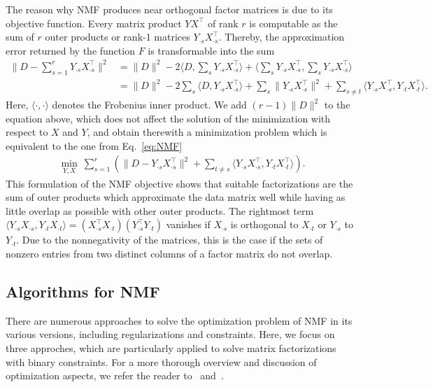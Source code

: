 The reason why NMF produces near orthogonal factor matrices is due to its objective function. Every matrix product $YX^\top$ of rank $r$ is computable as the sum of $r$ outer products or rank-1 matrices $Y_{\cdot s}X_{\cdot s}^\top$. Thereby, the approximation error returned by the function $F$ is transformable into the sum
\begin{align*}
\|D-\sum_{s=1}^rY_{\cdot s}X_{\cdot s}^\top\|^2 &= \|D\|^2 -2\langle D,\sum_sY_{\cdot s}X_{\cdot s}^\top\rangle +\langle \sum_sY_{\cdot s}X_{\cdot s}^\top,\sum_sY_{\cdot s}X_{\cdot s}^\top\rangle\\
&= \|D\|^2 -2\sum_s\langle D,Y_{\cdot s}X_{\cdot s}^\top\rangle +\sum_s \|Y_{\cdot s}X_{\cdot s}^\top\|^2 + \sum_{s\neq t}\langle Y_{\cdot s}X_{\cdot s}^\top,Y_{\cdot t}X_{\cdot t}^\top\rangle.
\end{align*}
Here, $\langle\cdot,\cdot\rangle$ denotes the Frobenius inner product. We add $(r-1)\|D\|^2$ to the equation above, which does not affect the solution of the minimization with respect to $X$ and $Y$, and obtain therewith a minimization problem which is equivalent to the one from Eq.~\eqref{eq:NMF} 
\begin{align}
\min_{Y,X}\ \sum_{s=1}^r \left( \|D-Y_{\cdot s}X_{\cdot s}^\top\|^2 + \sum_{t\neq s}\langle Y_{\cdot s}X_{\cdot s}^\top,Y_{\cdot t}X_{\cdot t}^\top\rangle\right).\label{eq:NMFOrth}
\end{align}
This formulation of the NMF objective shows that suitable factorizations are the sum of outer products which approximate the data matrix well while having as little overlap as possible with other outer products. The rightmost term $\langle Y_{\cdot s}X_{\cdot s},Y_{\cdot t}X_{\cdot t}\rangle = (X_{\cdot s}^\top X_{\cdot t})(Y_{\cdot s}^\top Y_{\cdot t})$ vanishes if $X_{\cdot s}$ is orthogonal to $X_{\cdot t}$ or $Y_{\cdot s}$ to $Y_{\cdot t}$. Due to the nonnegativity of the matrices, this is the case if the sets of nonzero entries from two distinct columns of a factor matrix do not overlap. 
\subsection{Algorithms for NMF}\label{sec:ZS:algNMF}
There are numerous approaches to solve the optimization problem of NMF in its various versions, including regularizations and constraints. Here, we focus on three approches, which are particularly applied to solve matrix factorizations with binary constraints. For a more thorough overview and discussion of optimization aspects, we refer the reader to~\cite{cichocki2009nonnegative} and~\cite{kim2014algorithms}.
%
